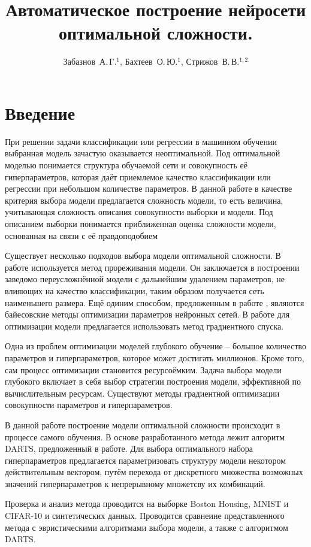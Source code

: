 \documentclass[12pt,twoside]{article}
\title
    [Автоматическое построение нейросети оптимальной сложности ] %
    {Автоматическое построение нейросети оптимальной сложности. }
\author
    {Забазнов~А.\,Г.$^1$, Бахтеев~О.\,Ю.$^1$, Стрижов~В.\,В.$^{1, 2}$} %
\begin{document}
\maketitle


\section{Введение}
При решении задачи классификации или регрессии в машинном обучении выбранная модель зачастую оказывается неоптимальной.
Под оптимальной моделью понимается структура обучаемой сети и совокупность её гиперпараметров, которая даёт приемлемое качество классификации или регрессии при небольшом количестве параметров. В данной работе в качестве критерия выбора модели предлагается сложность модели, то есть величина, учитывающая сложность описания совокупности выборки и модели. Под описанием выборки понимается приближенная оценка сложности модели, основанная на связи с её правдоподобием\cite{DescriptionLength}

Существует несколько подходов выбора модели оптимальной сложности. В работе \cite{BrainDamage} используется метод прореживания модели. Он заключается в построении заведомо переусложнённой модели с дальнейшим удалением параметров, не влияющих на качество классификации, таким образом получается сеть наименьшего размера. Ещё одиним способом, предложенным в работе \cite{BayesOptim}, являются байесовские методы оптимизации параметров нейронных сетей. В работе\cite{GradientOptim} для оптимизации модели предлагается использовать метод градиентного спуска. 

Одна из проблем оптимизации моделей глубокого обучение -- большое количество параметров и гиперпараметров, которое может достигать миллионов. Кроме того, сам процесс оптимизации становится ресурсоёмким. Задача выбора модели глубокого включает в себя выбор стратегии построения модели, эффективной по вычислительным ресурсам. Существуют методы градиентной оптимизации совокупности параметров и гиперпараметров.

В данной работе построение модели оптимальной сложности происходит в процессе самого обучения. В основе разработанного метода лежит алгоритм DARTS, предложенный в работе\cite{DARTS}. Для выбора оптимального набора гиперпараметров предлагается  параметризовать структуру
модели некотором действительным вектором, путём перехода от дискретного множества возможных значений гиперпараметров к непрерывному множетсву их комбинаций.

Проверка и анализ метода проводится на выборке Boston Housing\cite{Boston}, MNIST\cite{MNIST} и  CIFAR-10\cite{CIFAR-10} и синтетических данных. Проводится сравнеине представленного метода с эвристическими алгоритмами выбора модели,  а также с алгоритмом DARTS.
\end{document}
